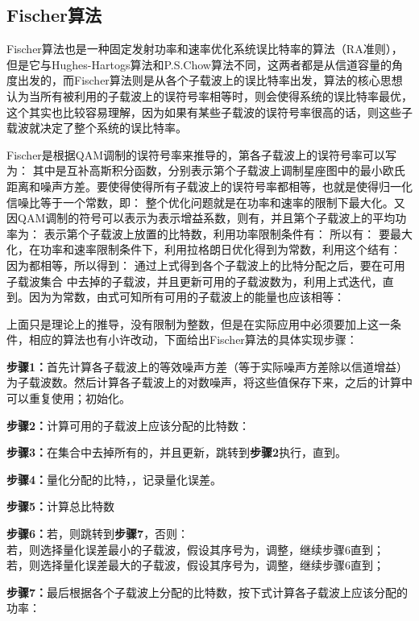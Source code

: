 \subsection{Fischer算法}
Fischer算法\cite{fischer1996new}也是一种固定发射功率和速率优化系统误比特率的算法（RA准则），但是它与Hughes-Hartogs算法和P.S.Chow算法不同，这两者都是从信道容量的角度出发的，而Fischer算法则是从各个子载波上的误比特率出发，算法的核心思想认为当所有被利用的子载波上的误符号率相等时，则会使得系统的误比特率最优，这个其实也比较容易理解，因为如果有某些子载波的误符号率很高的话，则这些子载波就决定了整个系统的误比特率。

Fischer是根据QAM调制的误符号率来推导的，第各子载波上的误符号率可以写为：
其中是互补高斯积分函数，分别表示第个子载波上调制星座图中的最小欧氏距离和噪声方差。要使得使得所有子载波上的误符号率都相等，也就是使得归一化信噪比等于一个常数，即：
整个优化问题就是在功率和速率的限制下最大化。又因QAM调制的符号可以表示为表示增益系数，则有，并且第个子载波上的平均功率为：
表示第个子载波上放置的比特数，利用功率限制条件有：
所以有：
要最大化，在功率和速率限制条件下，利用拉格朗日优化得到为常数，利用这个结有：
因为都相等，所以得到：
通过上式得到各个子载波上的比特分配之后，要在可用子载波集合 中去掉的子载波，并且更新可用的子载波数为，利用上式迭代，直到。因为为常数，由式可知所有可用的子载波上的能量也应该相等：

上面只是理论上的推导，没有限制为整数，但是在实际应用中必须要加上这一条件，相应的算法也有小许改动，下面给出Fischer算法的具体实现步骤：
\begin{description}
\item{\bf{步骤1：}}首先计算各子载波上的等效噪声方差（等于实际噪声方差除以信道增益）为子载波数。然后计算各子载波上的对数噪声，将这些值保存下来，之后的计算中可以重复使用；初始化。
\item{\bf{步骤2：}}计算可用的子载波上应该分配的比特数：
\item{\bf{步骤3：}}在集合中去掉所有的，并且更新，跳转到\textbf{步骤2}执行，直到。
\item{\bf{步骤4：}}量化分配的比特，，记录量化误差。
\item{\bf{步骤5：}}计算总比特数
\item{\bf{步骤6：}}若，则跳转到\textbf{步骤7}，否则：\\
若，则选择量化误差最小的子载波，假设其序号为，调整，继续步骤6直到；\\
若，则选择量化误差最大的子载波，假设其序号为，调整，继续步骤6直到；
\item{\bf{步骤7：}}最后根据各个子载波上分配的比特数，按下式计算各子载波上应该分配的功率：
\end{description}

